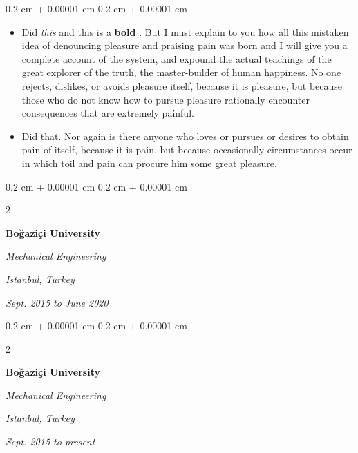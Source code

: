 \documentclass[10pt, letterpaper]{article}
\newenvironment{highlights}{
    \begin{itemize}[
        topsep=0.10 cm,
        parsep=0.10 cm,
        partopsep=0pt,
        itemsep=0pt,
        leftmargin=0.4 cm + 10pt
    ]
}{
    \end{itemize}
} %
\newenvironment{onecolentry}{
    \begin{adjustwidth}{
        0.2 cm + 0.00001 cm
    }{
        0.2 cm + 0.00001 cm
    }
}{
    \end{adjustwidth}
} %
\newenvironment{twocolentry}[2][]{
    \onecolentry
    \def\secondColumn{#2}
    \setcolumnwidth{\fill, 4.5 cm}
    \begin{paracol}{2}
}{
    \switchcolumn \raggedleft \secondColumn
    \end{paracol}
    \endonecolentry
} %
\let\hrefWithoutArrow\href
\renewcommand{\href}[2]{\hrefWithoutArrow{#1}{\mbox{\ifthenelse{\equal{#2}{}}{ }{#2 }\raisebox{.15ex}{\footnotesize \faExternalLink*}}}}
\begin{document}
        \vspace{0.10 cm-3px}
        \begin{onecolentry}
            \begin{highlights}
                \item Did \textit{this} and this is a \textbf{bold} \href{https://example.com}{link}. But I must explain to you how all this mistaken idea of denouncing pleasure and praising pain was born and I will give you a complete account of the system, and expound the actual teachings of the great explorer of the truth, the master-builder of human happiness. No one rejects, dislikes, or avoids pleasure itself, because it is pleasure, but because those who do not know how to pursue pleasure rationally encounter consequences that are extremely painful.
                \item Did that. Nor again is there anyone who loves or pursues or desires to obtain pain of itself, because it is pain, but because occasionally circumstances occur in which toil and pain can procure him some great pleasure.
            \end{highlights}
        \end{onecolentry}


        \vspace{0.2 cm-3px}

        \begin{twocolentry}{
        \textit{Istanbul, Turkey}    
            
        \textit{Sept. 2015 to June 2020}}
            \textbf{Boğaziçi University}

            \textit{Mechanical Engineering}
        \end{twocolentry}



        \vspace{0.2 cm-3px}

        \begin{twocolentry}{
        \textit{Istanbul, Turkey}    
            
        \textit{Sept. 2015 to present}}
            \textbf{Boğaziçi University}

            \textit{Mechanical Engineering}
        \end{twocolentry}
\end{document}

